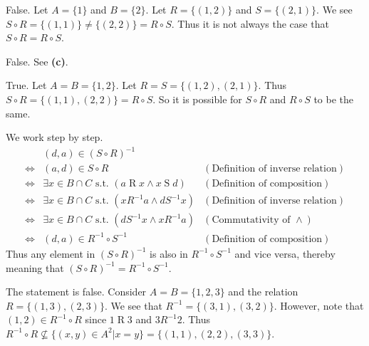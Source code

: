 \begin{questions}
    \item \begin{partquestions}{\alph*}
        \item False. Let $A = \{1\}$ and $B = \{2\}$. Let $R = \{(1, 2)\}$ and $S = \{(2, 1)\}$. We see $S \circ R = \{(1, 1)\} \neq \{(2, 2)\} = R \circ S$. Thus it is not always the case that $S \circ R = R \circ S$.
        \item False. See \textbf{(c)}.
        \item True. Let $A = B = \{1, 2\}$. Let $R = S = \{(1, 2), (2, 1)\}$. Thus $S \circ R = \{(1, 1), (2, 2)\} = R \circ S$. So it is possible for $S \circ R$ and $R \circ S$ to be the same.
    \end{partquestions}

    \item We work step by step.
    \begin{align*}
        &(d, a) \in (S \circ R)^{-1}\\
        \iff& (a, d) \in S \circ R & (\text{Definition of inverse relation})\\
        \iff& \exists x \in B \cap C \text{ s.t. } (a \mathrel{R} x \land x \mathrel{S} d) & (\text{Definition of composition})\\
        \iff& \exists x \in B \cap C \text{ s.t. } (x \mathrel{R^{-1}} a \land d \mathrel{S^{-1}} x) & (\text{Definition of inverse relation})\\
        \iff& \exists x \in B \cap C \text{ s.t. } (d \mathrel{S^{-1}} x \land x \mathrel{R^{-1}} a) & (\text{Commutativity of } \land)\\
        \iff& (d, a) \in R^{-1} \circ S^{-1} & (\text{Definition of composition})
    \end{align*}
    Thus any element in $(S \circ R)^{-1}$ is also in $R^{-1} \circ S^{-1}$ and vice versa, thereby meaning that $(S \circ R)^{-1} = R^{-1} \circ S^{-1}$.

    \item The statement is false. Consider $A = B = \{1, 2, 3\}$ and the relation $R = \{(1, 3), (2, 3)\}$. We see that $R^{-1} = \{(3, 1), (3, 2)\}$. However, note that $(1, 2) \in R^{-1} \circ R$ since $1 \mathrel{R} 3$ and $3 \mathrel{R^{-1}} 2$. Thus $R^{-1} \circ R \not\subseteq \{(x, y) \in A^2 \vert x = y\} = \{(1, 1), (2, 2), (3, 3)\}$.
\end{questions}
